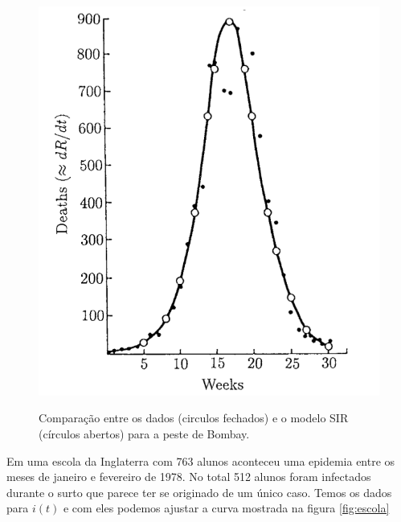 \documentclass[a4paper,11pt]{report}
\begin{document}
\begin{figure}[ht!]
\begin{center}
\includegraphics[scale=0.3]{./images/bombay-plague}
\label{fig:Bombay}
\caption{Compara\c{c}\~ao entre os dados (circulos fechados) e o modelo SIR (c\'irculos abertos) para a peste de Bombay.}
\end{center}
\end{figure}

Em uma escola da Inglaterra com 763 alunos aconteceu uma epidemia entre os meses de janeiro e fevereiro de 1978. No total 512 alunos foram infectados durante o surto que parece ter se originado de um \'unico caso. Temos os dados para $i(t)$ e com eles podemos ajustar a curva mostrada na figura \ref{fig:escola}
\end{document}

